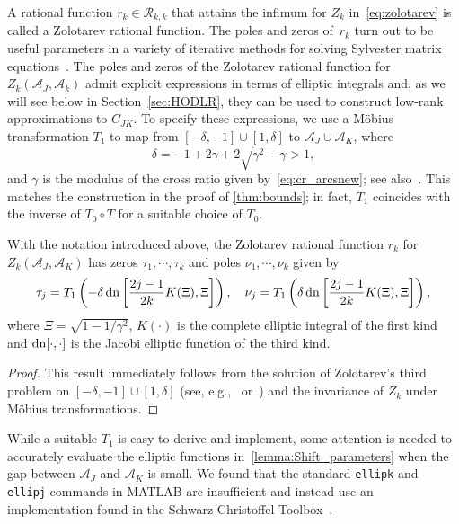 \documentclass[final,reqno,onefignum,onetabnum]{siamart190516}
\begin{document}
A rational function \hbox{$r_k \in \mathcal{R}_{k,k}$} that attains the infimum for $Z_k$ in~\eqref{eq:zolotarev} is called a Zolotarev rational function. The poles and zeros of~$r_k$ turn out to be useful parameters in a variety of iterative methods for solving Sylvester matrix equations~\cite{benner2009adi,druskin2011analysis,li2002low, wachspress1962optimum}. The poles and zeros of the Zolotarev rational function for 
$Z_k(\mathcal{A}_J, \mathcal{A}_k)$
admit explicit expressions in terms of elliptic integrals and, as we will see below 
in Section~\ref{sec:HODLR}, they can be used to construct low-rank approximations to $C_{JK}$. 
To specify these expressions, we use a M\"obius transformation $T_1$ to map from 
$[-\delta, -1] \cup [1, \delta]$ to $\mathcal A_J \cup \mathcal A_K$, where 
$$\delta =-1 + 2 \gamma + 2 \sqrt{\gamma^2-\gamma} > 1,$$
and $\gamma$ is the modulus of the cross ratio given by~\eqref{eq:cr_arcsnew}; see also~\cite[Eq. (3.7)]{Beckermann2019}.
This matches the construction in the proof of \cref{thm:bounds}; in fact, $T_1$ coincides 
with the inverse of $T_0 \circ T$ for a suitable choice of $T_0$.
 \begin{lemma}
\label{lemma:Shift_parameters}
With the notation introduced above, the Zolotarev rational function $r_k$ for $Z_k(\mathcal{A}_J, \mathcal{A}_K)$ has  zeros $\tau_1, \cdots, \tau_k$  and  poles $\nu_1, \cdots, \nu_k$ given by
$$ \tau_j = T_1\left( -\delta \, {\rm dn}\left[ \frac{2j - 1}{2k} K(\Xi), \Xi \right] \right), \quad \nu_j = T_1\left( \delta \, {\rm dn}\left[ \frac{2j - 1}{2k} K(\Xi), \Xi \right] \right), $$
where $\Xi = \sqrt{1-1/\gamma^2}$, $K(\cdot)$ is the complete elliptic integral of the first kind and ${\rm dn}[\cdot, \cdot]$ is the Jacobi elliptic function of the third kind.
\end{lemma}
\begin{proof}
This result immediately follows from the solution of Zolotarev's third problem on $[-\delta, -1] \cup [1, \delta]$
(see, e.g.,~\cite{Akhiezer1990} or~\cite[Theorem 2.1]{Fortunato2020}) and the invariance of $Z_k$ under M\"obius transformations.
\end{proof}
While a suitable $T_1$ is easy to derive and implement, some attention
is needed to 
accurately evaluate the elliptic functions in~\cref{lemma:Shift_parameters}
when the gap between $\mathcal{A}_J$ and $\mathcal{A}_K$ is small. We found that the standard \texttt{ellipk} and \texttt{ellipj} commands in MATLAB are insufficient and instead use an implementation found in the Schwarz-Christoffel Toolbox~\cite{driscoll1994schwarz}.
\end{document}
